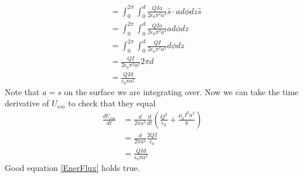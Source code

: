 \documentclass[11pt]{article}
\numberwithin{equation}{section}
\begin{document}
\begin{enumerate}[(a)]
\begin{align*}
&= \int_0^{2\pi}\int_0^{d}\frac{QIa}{2\epsilon_0\pi^2 a^4}\hat{s}\cdot ad\phi dz\hat{s}\\
&= \int_0^{2\pi}\int_0^{d}\frac{QIa}{2\epsilon_0\pi^2 a^4}ad\phi dz\\
&= \int_0^{2\pi}\int_0^{d}\frac{QI}{2\epsilon_0\pi^2 a^2}d\phi dz\\
&= \frac{QI}{2\epsilon_0\pi^2 a^2}2\pi d\\
&= \frac{QId}{\epsilon_0\pi a^2}
\end{align*}
Note that $a=s$ on the surface we are integrating over. Now we can take the time derivative of $U_{em}$ to check that they equal 
\begin{align*}
\frac{dU_{em}}{dt} &= \frac{d}{2\pi a^2}\frac{d}{dt}\left(\frac{Q^2}{\epsilon_0} + \frac{\mu_0I^2a^2}{8}\right)\\
&= \frac{d}{2\pi a^2}\frac{2QI}{\epsilon_0}\\
&= \frac{QId}{\epsilon_0\pi a^2}
\end{align*}
Good equation \ref{EnerFlux} holds true.
\end{enumerate}
\end{document}
